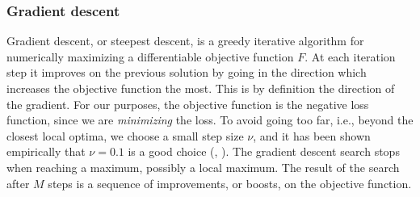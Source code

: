 \subsubsection{Gradient descent}
Gradient descent, or steepest descent, is a greedy iterative algorithm for numerically maximizing a differentiable objective function $F$. At each iteration step it improves on the previous solution by going in the direction which increases the objective function the most. This is by definition the direction of the gradient. For our purposes, the objective function is the negative loss function, since we are \textit{minimizing} the loss. To avoid going too far, i.e., beyond the closest local optima, we choose a small step size $\nu$, and it has been shown empirically that $\nu=0.1$ is a good choice (\cite{buhlmann-yu}, \cite{buhlmann2006}). The gradient descent search stops when reaching a maximum, possibly a local maximum. The result of the search after $M$ steps is a sequence of improvements, or boosts, on the objective function.

